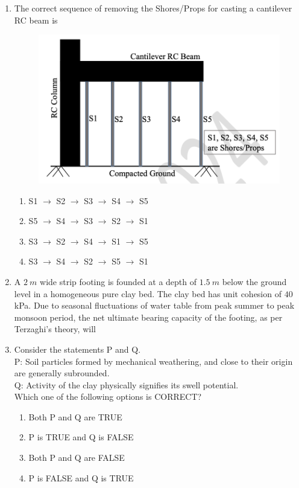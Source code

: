 \documentclass[journal]{IEEEtran}
\begin{document}
\begin{enumerate}
\item The correct sequence of removing the Shores/Props for casting a cantilever RC beam is  
\hfill {}  
\begin{figure}[H]
    \centering
    \includegraphics[width=0.6\columnwidth]{figs/Q17.png} 
    \caption{}
    \label{fig:placeholder}
\end{figure}
\begin{enumerate}
\item S1 $\rightarrow$ S2 $\rightarrow$ S3 $\rightarrow$ S4 $\rightarrow$ S5
\item S5 $\rightarrow$ S4 $\rightarrow$ S3 $\rightarrow$ S2 $\rightarrow$ S1
\item S3 $\rightarrow$ S2 $\rightarrow$ S4 $\rightarrow$ S1 $\rightarrow$ S5
\item S3 $\rightarrow$ S4 $\rightarrow$ S2 $\rightarrow$ S5 $\rightarrow$ S1
\end{enumerate}

\item A $2 \ m$ wide strip footing is founded at a depth of $1.5 \ m$ below the ground level in a homogeneous pure clay bed. The clay bed has unit cohesion of $40$ kPa. Due to seasonal fluctuations of water table from peak summer to peak monsoon period, the net ultimate bearing capacity of the footing, as per Terzaghi's theory, will  
\hfill {}  
\begin{enumerate}
\end{enumerate}

\item Consider the statements P and Q.  \\
P: Soil particles formed by mechanical weathering, and close to their origin are generally subrounded.  \\
Q: Activity of the clay physically signifies its swell potential.  \\
Which one of the following options is CORRECT?  
\hfill {}  
\begin{enumerate}
\item Both P and Q are TRUE
\item P is TRUE and Q is FALSE
\item Both P and Q are FALSE
\item P is FALSE and Q is TRUE
\end{enumerate}


\end{enumerate}
\end{document}
